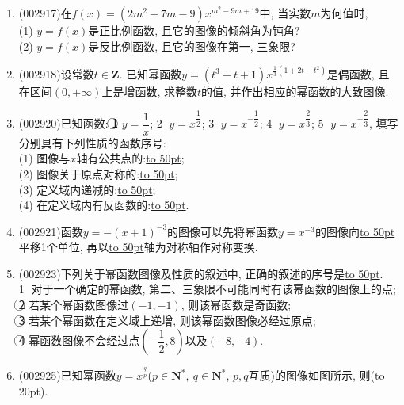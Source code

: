\documentclass[10pt,a4paper]{article}
\newcommand{\blank}[1]{\underline{\hbox to #1pt{}}}
\newcommand{\bracket}[1]{(\hbox to #1pt{})}
\begin{document}
\begin{enumerate}[1.]
\item {\tiny (002917)}在$f(x)=(2m^2-7m-9)x^{m^2-9m+19}$中, 当实数$m$为何值时,\\
(1) $y=f(x)$是正比例函数, 且它的图像的倾斜角为钝角?\\
(2) $y=f(x)$是反比例函数, 且它的图像在第一, 三象限?
\item {\tiny (002918)}设常数$t\in \mathbf{Z}$. 已知幂函数$y=(t^3-t+1){x^{\frac 13(1+2t-t^2)}}$是偶函数, 且在区间$(0,+\infty)$上是增函数, 求整数$t$的值, 并作出相应的幂函数的大致图像.
\item {\tiny (002920)}已知函数: \textcircled{1} $y=\dfrac 1x$; \textcircled{2} $y=x^{\dfrac 12}$; \textcircled{3} $y=x^{-\dfrac 12}$; \textcircled{4} $y={x^{\dfrac 23}}$; \textcircled{5} $y=x^{-\dfrac 23}$, 填写分别具有下列性质的函数序号:\\ 
(1) 图像与$x$轴有公共点的:\blank{50};\\
(2) 图像关于原点对称的:\blank{50};\\
(3) 定义域内递减的:\blank{50};\\
(4) 在定义域内有反函数的:\blank{50}.
\item {\tiny (002921)}函数$y=-(x+1)^{-3}$的图像可以先将幂函数$y=x^{-3}$的图像向\blank{50}平移1个单位, 再以\blank{50}轴为对称轴作对称变换.
\item {\tiny (002923)}下列关于幂函数图像及性质的叙述中, 正确的叙述的序号是\blank{50}.\\
\textcircled{1} 对于一个确定的幂函数, 第二、三象限不可能同时有该幂函数的图像上的点;\\
\textcircled{2} 若某个幂函数图像过$(-1,-1)$, 则该幂函数是奇函数;\\
\textcircled{3} 若某个幂函数在定义域上递增, 则该幂函数图像必经过原点;\\
\textcircled{4} 幂函数图像不会经过点$(-\dfrac 12,8)$以及$(-8,-4)$.
\item {\tiny (002925)}已知幂函数$y=x^{\frac qp}$($p\in \mathbf{N}^*,\ q\in \mathbf{N}^*$, $p,q$互质)的图像如图所示, 则\bracket{20}.
\begin{center}

\end{center}
\end{enumerate}
\end{document}
